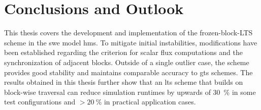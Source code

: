 \section{Conclusions and Outlook}\label{sec:conclusion-outlook}

This thesis covers the development and implementation of the \acrlong{frozen-block-LTS} scheme in the \gls{swe} model \gls{hms}.
To mitigate initial instabilities, modifications have been established regarding the criterion for scalar flux computations and the synchronization of adjacent blocks.
Outside of a single outlier case, the scheme provides good stability and maintains comparable accuracy to \acrlong{gts} schemes.
The results obtained in this thesis further show that an \gls{lts} scheme that builds on block-wise traversal can reduce simulation runtimes by upwards of \SI{30}{\percent} in some test configurations and $>\SI{20}{\percent}$ in practical application cases.






